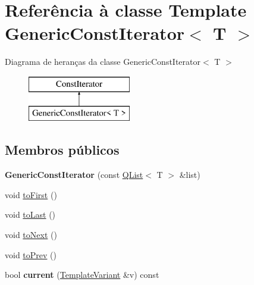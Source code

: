 \hypertarget{class_generic_const_iterator}{\section{Referência à classe Template Generic\-Const\-Iterator$<$ T $>$}
\label{class_generic_const_iterator}
}
Diagrama de heranças da classe Generic\-Const\-Iterator$<$ T $>$\begin{figure}[H]
\begin{center}
\leavevmode
\includegraphics[height=2.000000cm]{class_generic_const_iterator}
\end{center}
\end{figure}
\subsection*{Membros públicos}
\begin{DoxyCompactItemize}
\item 
\hypertarget{class_generic_const_iterator_a479207049184abd9d96fd6e26e1c7f36}{{\bfseries Generic\-Const\-Iterator} (const \hyperlink{class_q_list}{Q\-List}$<$ T $>$ \&list)}\label{class_generic_const_iterator_a479207049184abd9d96fd6e26e1c7f36}

\item 
void \hyperlink{class_generic_const_iterator_a7a848bf7b9f402e97732fe5abb2c71ca}{to\-First} ()
\item 
void \hyperlink{class_generic_const_iterator_acda76aed44e713788e17c3373ca1a0e3}{to\-Last} ()
\item 
void \hyperlink{class_generic_const_iterator_a8389e031d03169de4d6b9c55e7946d4b}{to\-Next} ()
\item 
void \hyperlink{class_generic_const_iterator_af7a123b30adb797bf7aa2b5a94b060b0}{to\-Prev} ()
\item 
\hypertarget{class_generic_const_iterator_af90a5d73dd4a1337f735d24ef3fc73c4}{bool {\bfseries current} (\hyperlink{class_template_variant}{Template\-Variant} \&v) const }\label{class_generic_const_iterator_af90a5d73dd4a1337f735d24ef3fc73c4}

\end{DoxyCompactItemize}


